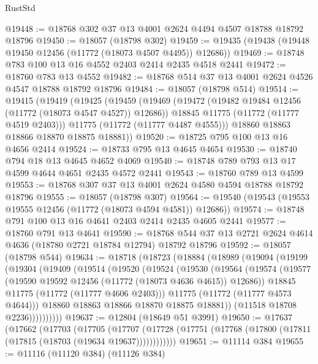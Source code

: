 \begin{lexlean}{RustStd}
\begin{coremodule}
@19448 := @18768 @302 @37 @13 @4001 @2624 @4494 @4507 @18788 @18792 @18796
@19450 := @18057 (@18798 @302)
@19459 := @19435 (@19438 (@19448 @19450 @12456 (@11772 (@18073 @4507 @4495)) @12686))
@19469 := @18748 @783 @100 @13 @16 @4552 @2403 @2414 @2435 @4518 @2441
@19472 := @18760 @783 @13 @4552
@19482 := @18768 @514 @37 @13 @4001 @2624 @4526 @4547 @18788 @18792 @18796
@19484 := @18057 (@18798 @514)
@19514 := @19415
    (@19419
      (@19425
        (@19459
          (@19469
            (@19472 (@19482 @19484 @12456 (@11772 (@18073 @4547 @4527)) @12686))
            @18845
            @11775
            (@11772 (@11777 @4519 @2403)))
          @11775
          (@11772 (@11777 @4487 @4555)))
        @18860
        @18863
        @18866
        @18870
        @18875
        @18881))
@19520 := @18725 @795 @100 @13 @16 @4656 @2414
@19524 := @18733 @795 @13 @4645 @4654
@19530 := @18740 @794 @18 @13 @4645 @4652 @4069
@19540 := @18748 @789 @793 @13 @17 @4599 @4644 @4651 @2435 @4572 @2441
@19543 := @18760 @789 @13 @4599
@19553 := @18768 @307 @37 @13 @4001 @2624 @4580 @4594 @18788 @18792 @18796
@19555 := @18057 (@18798 @307)
@19564 := @19540 (@19543 (@19553 @19555 @12456 (@11772 (@18073 @4594 @4581)) @12686))
@19574 := @18748 @791 @100 @13 @16 @4641 @2403 @2414 @2435 @4605 @2441
@19577 := @18760 @791 @13 @4641
@19590 := @18768 @544 @37 @13 @2721 @2624 @4614 @4636 (@18780 @2721 @18784 @12794) @18792 @18796
@19592 := @18057 (@18798 @544)
@19634 := @18718
    (@18723
      (@18884
        (@18989
          (@19094
            (@19199
              (@19304
                (@19409
                  (@19514
                    (@19520
                      (@19524
                        (@19530
                          (@19564
                            (@19574
                              (@19577 (@19590 @19592 @12456 (@11772 (@18073 @4636 @4615)) @12686))
                              @18845
                              @11775
                              (@11772 (@11777 @4606 @2403)))
                            @11775
                            (@11772 (@11777 @4573 @4644)))
                          @18860
                          @18863
                          @18866
                          @18870
                          @18875
                          @18881))
                      (@11518 @18708 @2236))))))))))
@19637 := @12804 (@18649 @51 @3991)
@19650 := @17637
    (@17662
      (@17703
        (@17705
          (@17707 (@17728 (@17751 (@17768 (@17800 (@17811 (@17815 (@18703 (@19634 @19637))))))))))))
@19651 := @11114 @384
@19655 := @11116 (@11120 @384) (@11126 @384)

\end{coremodule}
\end{lexlean}

